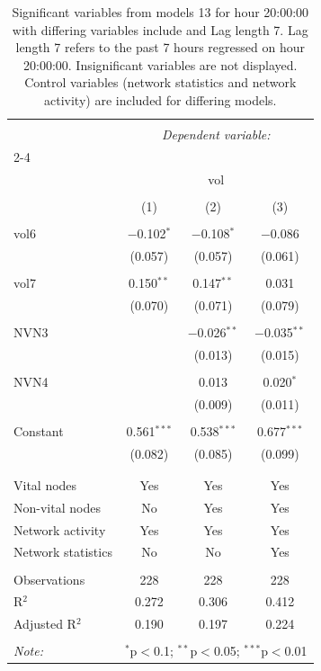
\begin{table}[!htbp] \centering 
  \caption{Significant variables from models 13 for hour 20:00:00 with differing variables include 
                               and Lag length 7. Lag length 7 refers to the past 7 hours regressed on hour 20:00:00. 
                               Insignificant variables are not displayed. 
                               Control variables (network statistics and network activity) are 
                               included for differing models.} 
  \label{Volumemodels2_t_hourlagged7} 
\scriptsize 
\begin{tabular}{@{\extracolsep{5pt}}lccc} 
\\[-1.8ex]\hline 
\hline \\[-1.8ex] 
 & \multicolumn{3}{c}{\textit{Dependent variable:}} \\ 
\cline{2-4} 
\\[-1.8ex] & \multicolumn{3}{c}{vol} \\ 
\\[-1.8ex] & (1) & (2) & (3)\\ 
\hline \\[-1.8ex] 
 vol6 & $-$0.102$^{*}$ & $-$0.108$^{*}$ & $-$0.086 \\ 
  & (0.057) & (0.057) & (0.061) \\ 
  & & & \\ 
 vol7 & 0.150$^{**}$ & 0.147$^{**}$ & 0.031 \\ 
  & (0.070) & (0.071) & (0.079) \\ 
  & & & \\ 
 NVN3 &  & $-$0.026$^{**}$ & $-$0.035$^{**}$ \\ 
  &  & (0.013) & (0.015) \\ 
  & & & \\ 
 NVN4 &  & 0.013 & 0.020$^{*}$ \\ 
  &  & (0.009) & (0.011) \\ 
  & & & \\ 
 Constant & 0.561$^{***}$ & 0.538$^{***}$ & 0.677$^{***}$ \\ 
  & (0.082) & (0.085) & (0.099) \\ 
  & & & \\ 
\hline \\[-1.8ex] 
Vital nodes & Yes & Yes & Yes \\ 
Non-vital nodes & No & Yes & Yes \\ 
Network activity & Yes & Yes & Yes \\ 
Network statistics & No & No & Yes \\ 
\hline &  &  &  \\ 
Observations & 228 & 228 & 228 \\ 
R$^{2}$ & 0.272 & 0.306 & 0.412 \\ 
Adjusted R$^{2}$ & 0.190 & 0.197 & 0.224 \\ 
\hline 
\hline \\[-1.8ex] 
\textit{Note:}  & \multicolumn{3}{r}{$^{*}$p$<$0.1; $^{**}$p$<$0.05; $^{***}$p$<$0.01} \\ 
\end{tabular} 
\end{table} 
